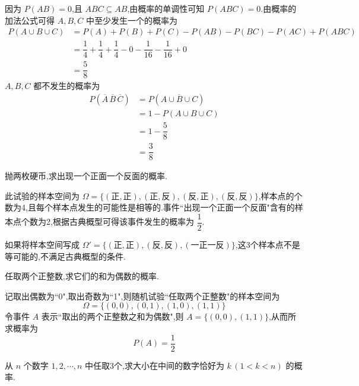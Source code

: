 \begin{solution}
    因为 $P(AB) = 0$,且 $ABC \subseteq AB$,由概率的单调性可知 $P(ABC) = 0$.由概率的加法公式可得 $A,B,C$ 中至少发生一个的概率为
    $$
    \begin{aligned}
        P(A \cup B \cup C) &= P(A) + P(B) + P(C) - P(AB) - P(BC) - P(AC) + P(ABC) \\
        &= \dfrac{1}{4} + \dfrac{1}{4} + \dfrac{1}{4} - 0 - \dfrac{1}{16} - \dfrac{1}{16} + 0 \\
        &= \dfrac{5}{8}
    \end{aligned}
    $$
    $A,B,C$ 都不发生的概率为
    $$
    \begin{aligned}
        P(\overline{A} \, \overline{B} \, \overline{C}) &= P(\overline{A \cup B \cup C}) \\
        &= 1 - P(A \cup B \cup C) \\
        &= 1 - \dfrac{5}{8} \\
        &= \dfrac{3}{8}
    \end{aligned}
    $$
\end{solution}


\question 抛两枚硬币,求出现一个正面一个反面的概率.

\begin{solution}
    此试验的样本空间为 $\varOmega = \{ (\text{正}, \text{正}), (\text{正}, \text{反}), (\text{反}, \text{正}), (\text{反}, \text{反}) \}$,样本点的个数为4,且每个样本点发生的可能性是相等的.事件``出现一个正面一个反面"含有的样本点个数为2,根据古典概型可得该事件发生的概率为 $\dfrac{1}{2}$.
\end{solution}

\begin{note}
    \indent 如果将样本空间写成 $\varOmega' = \{ (\text{正}, \text{正}), (\text{反}, \text{反}), (\text{一正一反}) \}$,这3个样本点不是等可能的,不满足古典概型的条件.
\end{note}

\question 任取两个正整数,求它们的和为偶数的概率.

\begin{solution}
    记取出偶数为``0",取出奇数为``1",则随机试验``任取两个正整数"的样本空间为
    $$
    \varOmega = \{ (0,0), (0,1), (1,0), (1,1) \}
    $$
    令事件 $A$ 表示``取出的两个正整数之和为偶数",则 $A = \{ (0,0), (1,1) \}$,从而所求概率为 $$P(A) = \dfrac{1}{2}$$
\end{solution}

\question 从 $n$ 个数字 $1,2,\cdots,n$ 中任取3个,求大小在中间的数字恰好为 $k \, (1 < k < n)$ 的概率.

